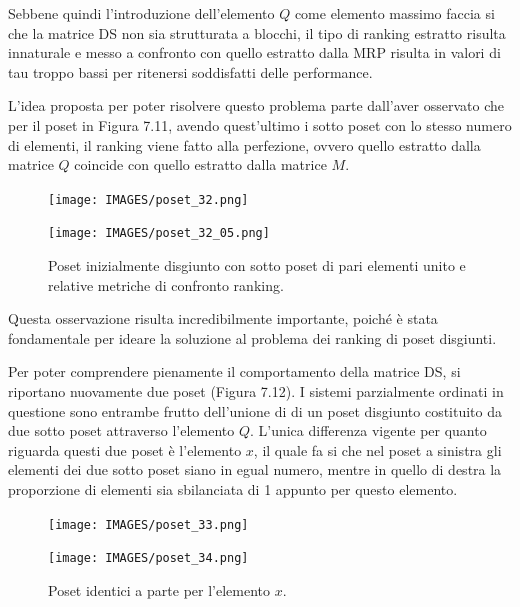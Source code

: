 \documentclass{report}
\begin{document}
Sebbene quindi l'introduzione dell'elemento $Q$ come elemento massimo faccia si che la matrice DS non sia strutturata a blocchi, il tipo di ranking estratto risulta innaturale e messo a confronto con quello estratto dalla MRP risulta in valori di tau troppo bassi per ritenersi soddisfatti delle performance.


L'idea proposta per poter risolvere questo problema parte dall'aver osservato che per il poset in Figura 7.11, avendo quest'ultimo i sotto poset con lo stesso numero di elementi, il ranking viene fatto alla perfezione, ovvero quello estratto dalla matrice $Q$ coincide con quello estratto dalla matrice $M$.

\begin{figure}[H]
  \centering
  \begin{minipage}[b]{0.4\textwidth}
    \texttt{[image: IMAGES/poset\_32.png]}
  \end{minipage}
  \hfill
  \begin{minipage}[b]{0.4\textwidth}
    \texttt{[image: IMAGES/poset\_32\_05.png]}
  \end{minipage}
  \caption{Poset inizialmente disgiunto con sotto poset di pari elementi unito e relative metriche di confronto ranking.}
\end{figure}

Questa osservazione risulta incredibilmente importante, poiché è stata fondamentale per ideare la soluzione al problema dei ranking di poset disgiunti.


Per poter comprendere pienamente il comportamento della matrice DS, si riportano nuovamente due poset (Figura 7.12). I sistemi parzialmente ordinati in questione sono entrambe frutto dell'unione di di un poset disgiunto costituito da due sotto poset attraverso l'elemento $Q$. L'unica differenza vigente per quanto riguarda questi due poset è l'elemento $x$, il quale fa si che nel poset a sinistra gli elementi dei due sotto poset siano in egual numero, mentre in quello di destra la proporzione di elementi sia sbilanciata di 1 appunto per questo elemento.

\begin{figure}[H]
  \centering
  \begin{minipage}[b]{0.4\textwidth}
    \texttt{[image: IMAGES/poset\_33.png]}
  \end{minipage}
  \hfill
  \begin{minipage}[b]{0.4\textwidth}
    \texttt{[image: IMAGES/poset\_34.png]}
  \end{minipage}
  \caption{Poset identici a parte per l'elemento $x$.}
\end{figure}
\end{document}
